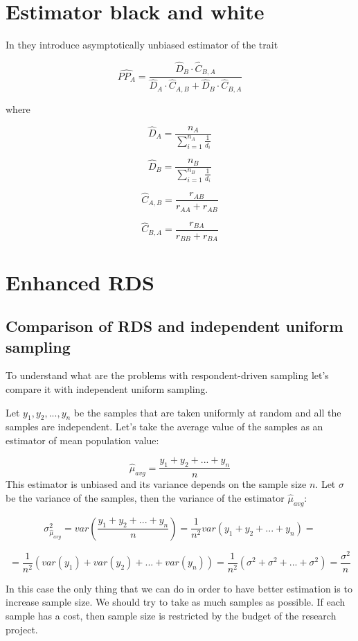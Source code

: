 \documentclass[12pt]{report}
\begin{document}
\section{Estimator black and white}

In \cite{salganik2004sampling} they introduce asymptotically unbiased estimator of the trait

$$ \widehat{PP_A} = \frac{ \widehat{D}_B \cdot \widehat{C}_{B, A}}{ 
\widehat{D}_A \cdot \widehat{C}_{A, B} + \widehat{D}_B \cdot \widehat{C}_{B, A}} $$

where

$$ \widehat{D}_A = \frac{n_A}{ \sum_{i=1}^{n_A} \frac{1}{d_i}} $$

$$ \widehat{D}_B = \frac{n_B}{ \sum_{i=1}^{n_B} \frac{1}{d_i}} $$

$$ \widehat{C}_{A, B} = \frac{r_{AB}}{r_{AA} + r_{AB}} $$

$$ \widehat{C}_{B, A} = \frac{r_{BA}}{r_{BB} + r_{BA}} $$


\section{Enhanced RDS}

\subsection{Comparison of RDS and independent uniform sampling}
To understand what are the problems with respondent-driven sampling let's compare it with independent uniform sampling.

Let $y_1, y_2, ..., y_n$ be the samples that are taken uniformly at random and all the samples are independent. Let's take the average value of the samples as an estimator of mean population value:

$$ \widehat{\mu}_{avg} = \frac{y_1 + y_2 + ... + y_n}{n}$$
This estimator is unbiased and its variance depends on the sample size $n$. Let $\sigma$ be the variance of the samples, then the variance of the estimator $ \widehat{\mu}_{avg}$:

$$ \sigma^2_{\hat{\mu}_{avg}} = var\left( \frac{y_1 + y_2 + ... + y_n}{n}\right)=\frac{1}{n^2} var(y_1 + y_2 + ... + y_n) =$$

$$= \frac{1}{n^2} \left(var(y_1) + var(y_2) + ... + var(y_n)\right)=\frac{1}{n^2} \left(\sigma^2 + \sigma^2 + ... + \sigma^2\right) = \frac{\sigma^2}{n}$$

In this case the only thing that we can do in order to have better estimation is to increase sample size. We should try to take as much samples as possible. If each sample has a cost, then sample size is restricted by the budget of the research project. 
\end{document}
